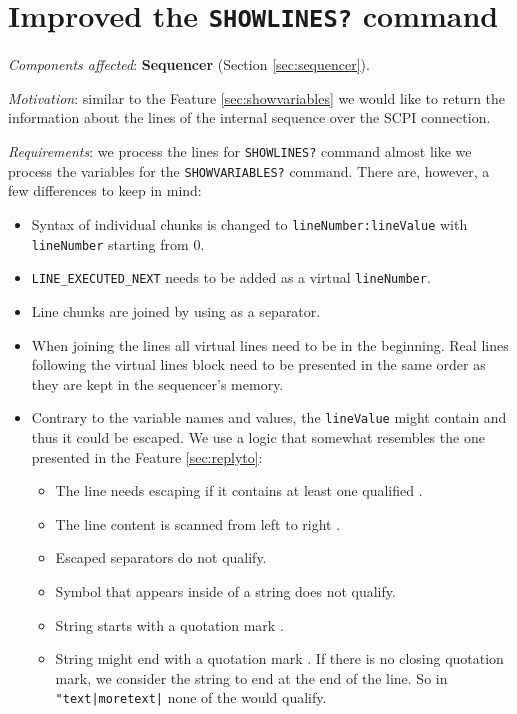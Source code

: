 \section{Improved the \texttt{SHOWLINES?} command}
\label{sec:showlines}

\textit{Components affected}: \textbf{Sequencer} (Section \ref{sec:sequencer}).

\textit{Motivation}: similar to the Feature \ref{sec:showvariables} we would like to return the information about the lines of the internal sequence over the SCPI connection.

\textit{Requirements}: we process the lines for \texttt{SHOWLINES?} command almost like we process the variables for the \texttt{SHOWVARIABLES?} command. There are, however, a few differences to keep in mind:

\begin{itemize}
	\item Syntax of individual chunks is changed to \texttt{lineNumber:lineValue} with \texttt{lineNumber} starting from 0.
	\item \texttt{LINE\_EXECUTED\_NEXT} needs to be added as a virtual \texttt{lineNumber}.
	\item Line chunks are joined by using \highlight{|} as a separator.
	\item When joining the lines all virtual lines need to be in the beginning. Real lines following the virtual lines block need to be presented in the same order as they are kept in the sequencer's memory.
	\item{
		Contrary to the variable names and values, the \texttt{lineValue} might contain \highlight{|} and thus it could be escaped. We use a logic that somewhat resembles the one presented in the Feature \ref{sec:replyto}:
		\begin{itemize}
			\item The line needs escaping if it contains at least one qualified \highlight{|}.
			\item The line content is scanned from left to right	.
			\item Escaped separators \highlight{\textbackslash |} do not qualify.
			\item Symbol \highlight{|} that appears inside of a string does not qualify.
			\item String starts with a quotation mark .
			\item String might end with a quotation mark . If there is no closing quotation mark, we consider the string to end at the end of the line. So in \texttt{"text|moretext|} none of the \highlight{|} would qualify.

\end{itemize}}
\end{itemize}
